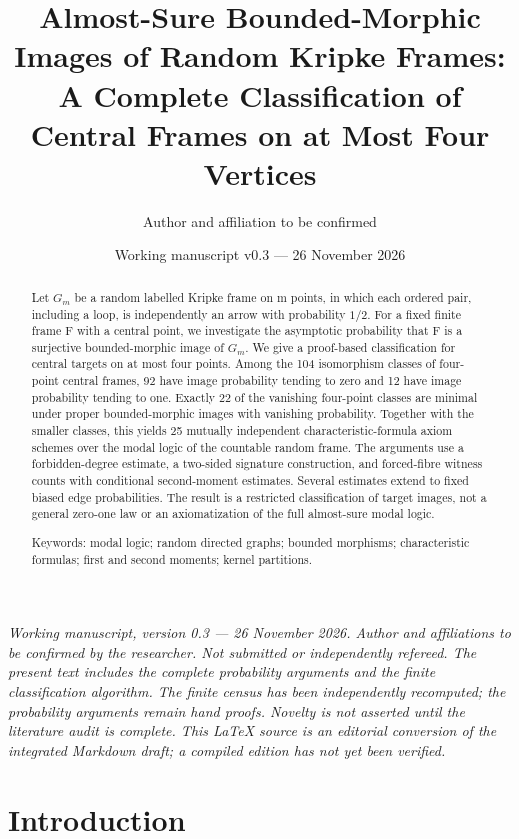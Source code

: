 \documentclass[11pt]{article}
\title{Almost-Sure Bounded-Morphic Images of Random Kripke Frames: A Complete Classification of Central Frames on at Most Four Vertices}
\author{Author and affiliation to be confirmed}
\date{Working manuscript v0.3 --- 26 November 2026}
\begin{document}
\maketitle

\noindent\small\textit{Working manuscript, version 0.3 --- 26 November 2026. Author and affiliations to be confirmed by the researcher. Not submitted or independently refereed. The present text includes the complete probability arguments and the finite classification algorithm. The finite census has been independently recomputed; the probability arguments remain hand proofs. Novelty is not asserted until the literature audit is complete. This LaTeX source is an editorial conversion of the integrated Markdown draft; a compiled edition has not yet been verified.}\normalsize\par\medskip

\begin{abstract}

Let $G_{m}$ be a random labelled Kripke frame on m points, in which each ordered pair, including a loop, is independently an arrow with probability $1/2$. For a fixed finite frame F with a central point, we investigate the asymptotic probability that F is a surjective bounded-morphic image of $G_{m}$. We give a proof-based classification for central targets on at most four points. Among the 104 isomorphism classes of four-point central frames, 92 have image probability tending to zero and 12 have image probability tending to one. Exactly 22 of the vanishing four-point classes are minimal under proper bounded-morphic images with vanishing probability. Together with the smaller classes, this yields 25 mutually independent characteristic-formula axiom schemes over the modal logic of the countable random frame. The arguments use a forbidden-degree estimate, a two-sided signature construction, and forced-fibre witness counts with conditional second-moment estimates. Several estimates extend to fixed biased edge probabilities. The result is a restricted classification of target images, not a general zero-one law or an axiomatization of the full almost-sure modal logic.

Keywords: modal logic; random directed graphs; bounded morphisms; characteristic formulas; first and second moments; kernel partitions.

\end{abstract}
\section{Introduction}
\end{document}
